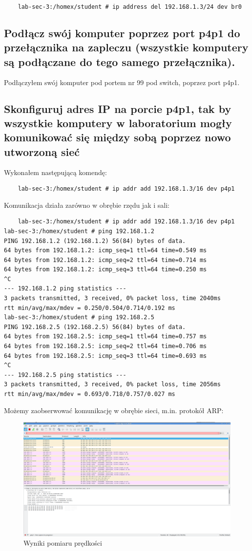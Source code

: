 \documentclass[polish, a4paper]{article}
\begin{document}
\begin{verbatim}
    lab-sec-3:/homex/student # ip address del 192.168.1.3/24 dev br0
\end{verbatim}

\subsection{Podłącz swój komputer poprzez port p4p1 do przełącznika na
zapleczu (wszystkie komputery są podłączane do tego samego
przełącznika).}

Podłączyłem swój komputer pod portem nr 99 pod switch, poprzez port p4p1.

\subsection{Skonfiguruj adres IP na porcie p4p1, tak by wszystkie
komputery w laboratorium mogły komunikować się między
sobą poprzez nowo utworzoną sieć}

Wykonałem następującą komendę:

\begin{verbatim}
    lab-sec-3:/homex/student # ip addr add 192.168.1.3/16 dev p4p1
\end{verbatim}

Komunikacja działa zarówno w obrębie rzędu jak i sali:

\begin{verbatim}
    lab-sec-3:/homex/student # ip addr add 192.168.1.3/16 dev p4p1
lab-sec-3:/homex/student # ping 192.168.1.2
PING 192.168.1.2 (192.168.1.2) 56(84) bytes of data.
64 bytes from 192.168.1.2: icmp_seq=1 ttl=64 time=0.549 ms
64 bytes from 192.168.1.2: icmp_seq=2 ttl=64 time=0.714 ms
64 bytes from 192.168.1.2: icmp_seq=3 ttl=64 time=0.250 ms
^C
--- 192.168.1.2 ping statistics ---
3 packets transmitted, 3 received, 0% packet loss, time 2040ms
rtt min/avg/max/mdev = 0.250/0.504/0.714/0.192 ms
lab-sec-3:/homex/student # ping 192.168.2.5
PING 192.168.2.5 (192.168.2.5) 56(84) bytes of data.
64 bytes from 192.168.2.5: icmp_seq=1 ttl=64 time=0.757 ms
64 bytes from 192.168.2.5: icmp_seq=2 ttl=64 time=0.706 ms
64 bytes from 192.168.2.5: icmp_seq=3 ttl=64 time=0.693 ms
^C
--- 192.168.2.5 ping statistics ---
3 packets transmitted, 3 received, 0% packet loss, time 2056ms
rtt min/avg/max/mdev = 0.693/0.718/0.757/0.027 ms

\end{verbatim}

Możemy zaobserwować komunikację w obrębie sieci, m.in. protokół ARP:

\begin{figure}[H]
\centering
\includegraphics[width=\textwidth]{p4p1.png}
\caption{Wyniki pomiaru prędkości}
\end{figure}
\end{document}
